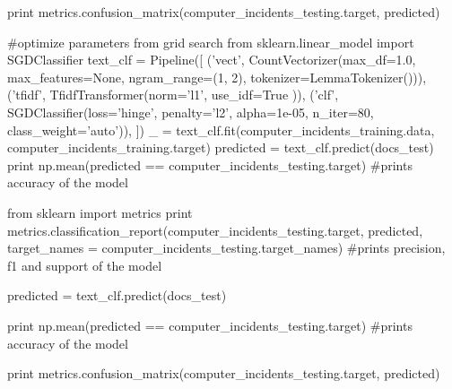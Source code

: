 \begin{pyverbatim}
print metrics.confusion_matrix(computer_incidents_testing.target, predicted)

#optimize parameters from grid search
from sklearn.linear_model import SGDClassifier
text_clf = Pipeline([
     ('vect', CountVectorizer(max_df=1.0, max_features=None, ngram_range=(1, 2), tokenizer=LemmaTokenizer())),
     ('tfidf', TfidfTransformer(norm='l1', use_idf=True )),
     ('clf', SGDClassifier(loss='hinge', penalty='l2',
                           alpha=1e-05, n_iter=80, class_weight='auto')),
])
_ = text_clf.fit(computer_incidents_training.data, computer_incidents_training.target)
predicted = text_clf.predict(docs_test)
print np.mean(predicted == computer_incidents_testing.target)
#prints accuracy of the model

from sklearn import metrics
print metrics.classification_report(computer_incidents_testing.target, predicted,
target_names = computer_incidents_testing.target_names) 
#prints precision, f1 and support of the model

predicted = text_clf.predict(docs_test)

print np.mean(predicted == computer_incidents_testing.target)
#prints accuracy of the model

print metrics.confusion_matrix(computer_incidents_testing.target, predicted)

\end{pyverbatim}

